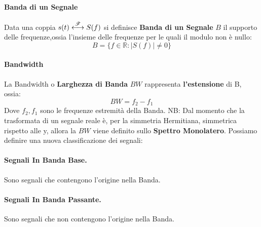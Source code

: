 \paragraph{Banda di un Segnale}
Data una coppia $s(t) \overset{{\mathscr{F}}}{\longleftrightarrow} S(f)$ si definisce \textbf{Banda di un Segnale} $B$ il supporto delle frequenze,ossia
l'insieme delle frequenze per le quali il modulo non è nullo:
\begin{equation}
    B = \{f \in \mathbb{R} : |S(f)| \neq 0\}
\end{equation}

\paragraph{Bandwidth} 
La Bandwidth o \textbf{Larghezza di Banda} $BW$ rappresenta \textbf{l'estensione} di B, ossia:
\begin{equation}
    BW = f_2 - f_1
\end{equation}
Dove $f_2, f_1$ sono le frequenze estremità della Banda. 
NB: Dal momento che la trasformata di un segnale reale è, per la simmetria Hermitiana, simmetrica rispetto alle y,
allora la $BW$ viene definito sullo \textbf{Spettro Monolatero}. Possiamo definire una nuova classificazione dei segnali:
\paragraph{Segnali In Banda Base.}Sono segnali che contengono l'origine nella Banda.
\paragraph{Segnali In Banda Passante.}Sono segnali che non contengono l'origine nella Banda.